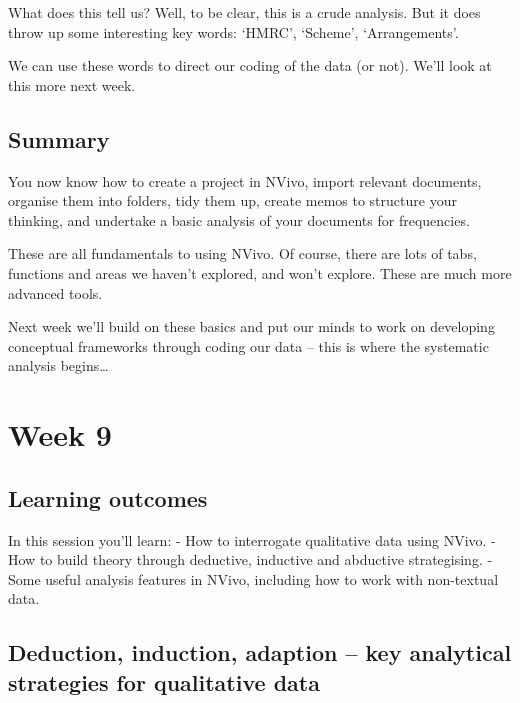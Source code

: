 \documentclass[]{book}
\theoremstyle{definition}
\theoremstyle{definition}
\theoremstyle{definition}
\theoremstyle{remark}
\begin{document}
What does this tell us? Well, to be clear, this is a crude analysis. But
it does throw up some interesting key words: `HMRC', `Scheme',
`Arrangements'.

We can use these words to direct our coding of the data (or not). We'll
look at this more next week.

\hypertarget{summary-7}{%
\section{Summary}\label{summary-7}}

You now know how to create a project in NVivo, import relevant
documents, organise them into folders, tidy them up, create memos to
structure your thinking, and undertake a basic analysis of your
documents for frequencies.

These are all fundamentals to using NVivo. Of course, there are lots of
tabs, functions and areas we haven't explored, and won't explore. These
are much more advanced tools.

Next week we'll build on these basics and put our minds to work on
developing conceptual frameworks through coding our data -- this is
where the systematic analysis begins\ldots{}

\hypertarget{week9}{%
\chapter{Week 9}\label{week9}}

\hypertarget{learning-outcomes-8}{%
\section{Learning outcomes}\label{learning-outcomes-8}}

In this session you'll learn: - How to interrogate qualitative data
using NVivo. - How to build theory through deductive, inductive and
abductive strategising. - Some useful analysis features in NVivo,
including how to work with non-textual data.

\hypertarget{deduction-induction-adaption-key-analytical-strategies-for-qualitative-data}{%
\section{Deduction, induction, adaption -- key analytical strategies for
qualitative
data}\label{deduction-induction-adaption-key-analytical-strategies-for-qualitative-data}}
\end{document}
